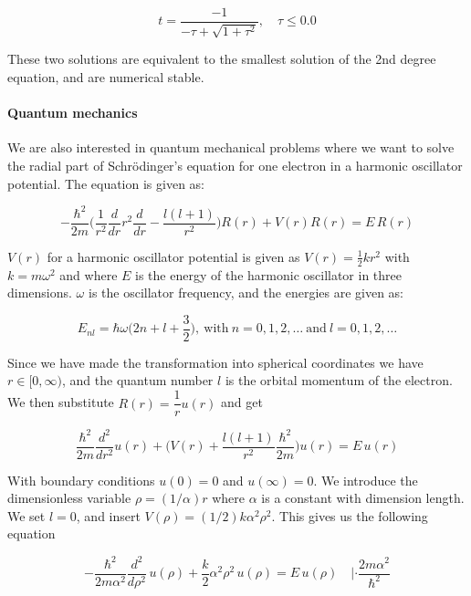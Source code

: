 \documentclass[a4paper, fontsize=11pt]{article}
\begin{document}
\begin{equation}
t = \frac{-1}{-\tau + \sqrt{1 + \tau^2}}, \quad \tau \leq 0.0
\end{equation}

These two solutions are equivalent to the smallest solution of the 2nd degree equation, and are numerical stable.

\paragraph{Quantum mechanics}
We are also interested in quantum mechanical problems where we want to solve the radial part of Schr\"{o}dinger's equation for one electron in a harmonic oscillator potential. The equation is given as:

\begin{equation}
-\dfrac{\hbar^2}{2m}\Big(\dfrac{1}{r^2} \dfrac{d}{dr} r^2 \dfrac{d}{dr} - \dfrac{l(l+1)}{r^2} \Big) R(r) +V(r)R(r)=E \, R(r)
\end{equation}

$V(r)$ for a harmonic oscillator potential is given as $V(r)=\frac{1}{2}kr^2$ with \\$k=m \omega^2$ and where $E$ is the energy of the harmonic oscillator in three dimensions. $\omega$ is the oscillator frequency, and the energies are given as:

\begin{equation}
E_{nl} = \hbar \omega \Big(2n+l+\frac{3}{2} \Big), \: \text{with} \: n=0,1,2, \hdots \: \text{and} \: l=0,1,2,\hdots
\end{equation}

Since we have made the transformation into spherical coordinates we have $r \in [0, \infty)$, and the quantum number $l$ is the orbital momentum of the electron. We then substitute $R(r)=\dfrac{1}{r}u(r)$ and get

\begin{equation}
\dfrac{\hbar^2}{2m} \dfrac{d^2}{dr^2} u(r) + \Big(V(r) + \dfrac{l(l+1)}{r^2} \dfrac{\hbar^2}{2m}\Big) u(r) = E \, u(r)
\end{equation}

With boundary conditions $u(0)=0$ and $u(\infty)=0$. We introduce the dimensionless variable $\rho = (1/\alpha)r$ where $\alpha$ is a constant with dimension length. We set $l=0$, and insert $V(\rho)=(1/2)k\alpha^2 \rho^2$. This gives us the following equation

\begin{equation}
-\dfrac{\hbar^2}{2m\alpha^2} \dfrac{d^2}{d\rho^2} \, u(\rho) + \dfrac{k}{2} \alpha^2 \rho^2 \, u(\rho) = E \, u(\rho) \quad |\cdot \dfrac{2m\alpha^2}{\hbar^2}
\end{equation}
\end{document}
